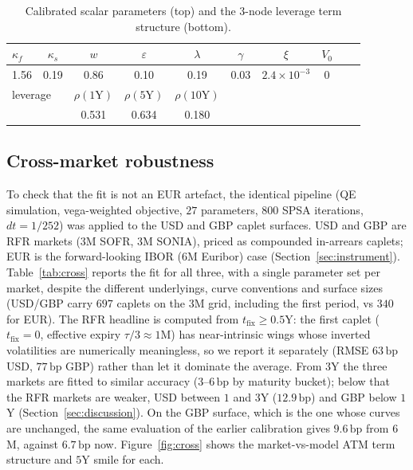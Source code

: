\documentclass[11pt]{article}
\newcommand{\bp}{\,\text{bp}}
\begin{document}
\begin{table}[!htbp]
\centering
\begin{tabular}{lccccccccc}
\toprule
\(\kappa_f\) & \(\kappa_s\) & \(w\) & \(\varepsilon\) & \(\lambda\) & \(\gamma\) & \(\xi\) &
\(V_0\) & \\
\midrule
1.56 & 0.19 & 0.86 & 0.10 & 0.19 & 0.03 & \(2.4\!\times\!10^{-3}\) & 0 & \\
\midrule
\multicolumn{2}{l}{leverage} & \(\rho(1\text{Y})\) & \(\rho(5\text{Y})\) & \(\rho(10\text{Y})\) &
\multicolumn{4}{l}{} \\
& & 0.531 & 0.634 & 0.180 & \multicolumn{4}{l}{} \\
\bottomrule
\end{tabular}
\caption{Calibrated scalar parameters (top) and the \(3\)-node leverage term structure (bottom).}
\label{tab:scalar}
\end{table}

\FloatBarrier
\subsection{Cross-market robustness}
To check that the fit is not an EUR artefact, the identical pipeline (QE simulation, vega-weighted
objective, \(27\) parameters, \(800\) SPSA iterations, \(dt=1/252\)) was applied to the USD and GBP caplet
surfaces. USD and GBP are RFR markets (3M SOFR, 3M SONIA), priced as compounded in-arrears caplets;
EUR is the forward-looking IBOR (6M Euribor) case (Section~\ref{sec:instrument}). Table~\ref{tab:cross} reports the fit for
all three, with a single parameter set per market, despite the different underlyings, curve
conventions and surface sizes (USD/GBP carry \(697\) caplets on the 3M grid, including the first
period, vs \(340\) for EUR). The RFR headline is computed from \(t_{\text{fix}}\ge0.5\)Y: the first
caplet (\(t_{\text{fix}}=0\), effective expiry \(\tau/3\approx1\)M) has near-intrinsic wings whose
inverted volatilities are numerically meaningless, so we report it separately (RMSE \(63\bp\) USD,
\(77\bp\) GBP) rather than let it dominate the average. From \(3\)Y the three markets are fitted to similar accuracy (\(3\)--\(6\bp\) by
maturity bucket); below that the RFR markets are weaker, USD between \(1\) and \(3\)Y (\(12.9\bp\)) and
GBP below \(1\)Y (Section~\ref{sec:discussion}). On the GBP surface, which is the one whose curves are
unchanged, the same evaluation of the earlier calibration gives \(9.6\bp\) from \(6\)M, against
\(6.7\bp\) now.
Figure~\ref{fig:cross} shows the market-vs-model ATM term structure and \(5\)Y smile for each.
\end{document}
